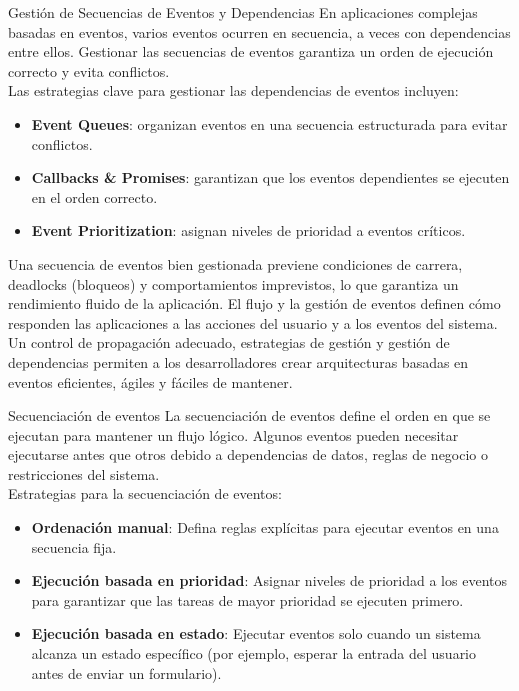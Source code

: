 \documentclass[11pt]{beamer}
\begin{document}
	
	\begin{frame}{Gestión de Secuencias de Eventos y Dependencias}
	\small
	En aplicaciones complejas basadas en eventos, varios eventos ocurren en secuencia, a veces con dependencias entre ellos. Gestionar las secuencias de eventos garantiza un orden de ejecución correcto y evita conflictos. \\
	Las estrategias clave para gestionar las dependencias de eventos incluyen:	
	
	\begin{itemize}
		\item \textbf{Event Queues}: organizan eventos en una secuencia estructurada para evitar conflictos.
		\item \textbf{Callbacks \& Promises}: garantizan que los eventos dependientes se ejecuten en el orden correcto.
		\item \textbf{Event Prioritization}: asignan niveles de prioridad a eventos críticos.
	\end{itemize}
	Una secuencia de eventos bien gestionada previene condiciones de carrera, deadlocks (bloqueos) y comportamientos imprevistos, lo que garantiza un rendimiento fluido de la aplicación.
	El flujo y la gestión de eventos definen cómo responden las aplicaciones a las acciones del usuario y a los eventos del sistema. Un control de propagación adecuado, estrategias de gestión y gestión de dependencias permiten a los desarrolladores crear arquitecturas basadas en eventos eficientes, ágiles y fáciles de mantener. 
	\end{frame}
	
	\begin{frame}{Secuenciación de eventos}
		La secuenciación de eventos define el orden en que se ejecutan para mantener un flujo lógico. Algunos eventos pueden necesitar ejecutarse antes que otros debido a dependencias de datos, reglas de negocio o restricciones del sistema.\\
	Estrategias para la secuenciación de eventos:
	\begin{itemize}
		\item \textbf{Ordenación manual}: Defina reglas explícitas para ejecutar eventos en una secuencia fija.
	\item \textbf{Ejecución basada en prioridad}: Asignar niveles de prioridad a los eventos para garantizar que las tareas de mayor prioridad se ejecuten primero.
	\item \textbf{Ejecución basada en estado}: Ejecutar eventos solo cuando un sistema alcanza un estado específico (por ejemplo, esperar la entrada del usuario antes de enviar un formulario).
	\end{itemize}	
	\end{frame}
	
\end{document}
